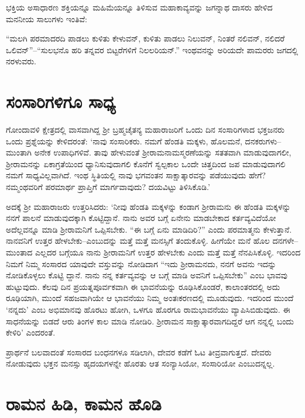 ಭಕ್ತಿಯ ಅಸಾಧಾರಣ ಶಕ್ತಿಯನ್ನೂ ಮಹಿಮೆಯನ್ನೂ ತಿಳಿಸುವ ಮಹಾಕಾವ್ಯವನ್ನು ಜಗನ್ನಾಥ ದಾಸರು ಹೇಳಿದ ಮನನೀಯ ಸಾಲುಗಳು ಇಂತಿವೆ:

“ಮಲಗಿ ಪರಮಾದರದಿ ಪಾಡಲು ಕುಳಿತು ಕೇಳುವನ್, ಕುಳಿತು ಪಾಡಲು ನಿಲುವನ್, ನಿಂತರೆ ನಲಿವನ್, ನಲಿದರೆ ಒಲಿವನ್​”–“ಸುಲಭನೊ ಹರಿ ತನ್ನವರ ಬಿಟ್ಟರೆಗಳಿಗೆ ನಿಲಲರಿಯನ್.” ಇಂಥವನನ್ನು ಅರಿಯದೇ ಪಾಮರರು ಜಗದಲ್ಲಿ ನರಳುವರು.


\section{ಸಂಸಾರಿಗಳಿಗೂ ಸಾಧ್ಯ}

ಗೋಂದಾವಳಿ ಕ್ಷೇತ್ರದಲ್ಲಿ ವಾಸವಾಗಿದ್ದ ಶ‍್ರೀ ಬ್ರಹ್ಮಚೈತನ್ಯ ಮಹಾರಾಜರಿಗೆ ಒಂದು ದಿನ ಸಂಸಾರಿಗಳಾದ ಭಕ್ತಜನರು ಒಂದು ಪ್ರಶ್ನೆಯನ್ನು ಕೇಳಿದರಂತೆ: ‘ನಾವು ಸಂಸಾರಿಕರು. ನಮಗೆ ಹೆಂಡತಿ ಮಕ್ಕಳು, ಹೊಲಮನೆ, ದನಕರುಗಳು–ಮುಂತಾಗಿ ಅನೇಕ ಉಪಾಧಿಗಳಿವೆ. ತಾವು ಹೇಳುವಂತೆ ಶ‍್ರೀರಾಮನಾಮಸ್ಮರಣೆಯನ್ನು ಸತತವಾಗಿ ಮಾಡುವುದಾಗಲೀ, ಶ‍್ರೀರಾಮನನ್ನು ಏಕಾಗ್ರತೆಯಿಂದ ಧ್ಯಾನಿಸುವುದಾಗಲಿ ಕೊನೆಗೆ ಸ್ವಲ್ಪಕಾಲ ಒಂದೇ ಚಿತ್ತದಿಂದ ಜಪ ಮಾಡುವುದಾಗಲಿ ನಮಗೆ ಸಾಧ್ಯವಿಲ್ಲವಾಗಿದೆ. ಇಂಥ ಸ್ಥಿತಿಯಲ್ಲಿ ನಾವು ಭಗವಂತನ ಸಾಕ್ಷಾತ್ಕಾರವನ್ನು ಪಡೆಯುವುದು ಹೇಗೆ? ನಮ್ಮಂಥವರಿಗೆ ಪರಮಾರ್ಥ ಪ್ರಾಪ್ತಿಗೆ ಮಾರ್ಗವಾವುದು? ದಯವಿಟ್ಟು ತಿಳಿಸಿಕೊಡಿ.’

ಅದಕ್ಕೆ ಶ‍್ರೀ ಮಹಾರಾಜರು ಉತ್ತರಿಸಿದರು: ‘ನೀವು ಹೆಂಡತಿ ಮಕ್ಕಳನ್ನು ಕಂಡಾಗ ಶ‍್ರೀರಾಮನು ಈ ಹೆಂಡತಿ ಮಕ್ಕಳನ್ನು ನನಗೆ ಪಾಲನೆ ಮಾಡುವುದಕ್ಕಾಗಿ ಕೊಟ್ಟಿದ್ದಾನೆ. ನಾನು ಅವರ ಬಗ್ಗೆ ಏನೇನು ಮಾಡಬೇಕಾದ ಕರ್ತವ್ಯವಿದೆಯೋ ಅದೆಲ್ಲವನ್ನೂ ಮಾಡಿ ಶ‍್ರೀರಾಮನಿಗೆ ಒಪ್ಪಿಸಬೇಕು. “ಈ ಬಗ್ಗೆ ಏನು ಮಾಡಿದಿರಿ?” ಎಂದು ಪರಮಾತ್ಮನು ಕೇಳುತ್ತಾನೆ. ನಾನವನಿಗೆ ಉತ್ತರ ಹೇಳಬೇಕು–ಎಂಬುದನ್ನು ಮತ್ತೆ ಮತ್ತೆ ಮನಸ್ಸಿಗೆ ತಂದುಕೊಳ್ಳಿ. ಹೀಗೆಯೇ ಮನೆ ಹೊಲ ದನಗಳೇ–ಮುಂತಾದ ಎಲ್ಲದರ ಬಗ್ಗೆಯೂ ನಾನು ಶ‍್ರೀರಾಮನಿಗೆ ಉತ್ತರ ಹೇಳಬೇಕು ಎಂದು ಮತ್ತೆ ಮತ್ತೆ ನೆನಪಿಸಿಕೊಳ್ಳಿ. ಇದರಿಂದ ನಿಮಗೆ ನಿಮ್ಮ ಸಂಸಾರದ ಯಾವುದೇ ವಸ್ತುವನ್ನು ನೋಡಿದಾಗ “ಇದು ಶ‍್ರೀರಾಮನದು, ನನಗೆ ಅವನು ಇದನ್ನು ನೋಡಿಕೊಳ್ಳಲು ಕೊಟ್ಟಿ ದ್ದಾನೆ. ನಾನು ನನ್ನ ಕರ್ತವ್ಯವನ್ನು ಆ ಬಗ್ಗೆ ಮಾಡಿ ಅವನಿಗೆ ಒಪ್ಪಿಸಬೇಕು” ಎಂಬ ಭಾವವು ಹುಟ್ಟುವುದು. ಕೆಲವು ದಿನ ಪ್ರಯತ್ನಪೂರ್ವಕವಾಗಿ ಈ ಭಾವನೆಯನ್ನು ರೂಢಿಸಿಕೊಂಡರೆ, ಕಾಲಾಂತರದಲ್ಲಿ ಅದು ರೂಢಿಯಾಗಿ, ಮುಂದೆ ಸಹಜವಾಗಿಯೇ ಆ ಭಾವನೆಯು ನಿಮ್ಮ ಅಂತಃಕರಣದಲ್ಲಿ ಮೂಡುವುದು. ಇದರಿಂದ ಮುಂದೆ ‘ನನ್ನದು’ ಎಂಬ ಅಭಿಮಾನವು ಹೊರಟು ಹೋಗಿ, ಒಳಗೂ ಹೊರಗೂ ರಾಮಭಾವನೆಯು ವ್ಯಾಪಿಸಿಬಿಡುವುದು. ಈ ಸಾಧನೆಯನ್ನು ಬಿಡದೆ ಆರು ತಿಂಗಳ ಕಾಲ ಮಾಡಿ ನೋಡಿರಿ. ಶ‍್ರೀರಾಮನ ಸಾಕ್ಷಾತ್ಕಾರವಾಗದಿದ್ದರೆ ಆಗ ನನ್ನಲ್ಲಿ ಬಂದು ಕೇಳಿರಿ’ ಎಂದರಂತೆ.

ಪ್ರಾರ್ಥನೆ ಬಲವಾದಂತೆ ಸಂಸಾರದ ಬಂಧನಗಳೂ ಸಡಿಲಾಗಿ, ದೇವರ ಕಡೆಗೆ ಓಟ ತೀವ್ರವಾಗುತ್ತದೆ. ದೇವರು ನೋಡುವುದು ಭಕ್ತನ ಮನಸ್ಸು ಹೃದಯಗಳನ್ನೇ ಹೊರತು ಆತ ಸಂನ್ಯಾಸಿಯೋ, ಸಂಸಾರಿಯೋ ಎಂಬುದನ್ನಲ್ಲ.


\section{ರಾಮನ ಹಿಡಿ, ಕಾಮನ ಹೊಡಿ}

